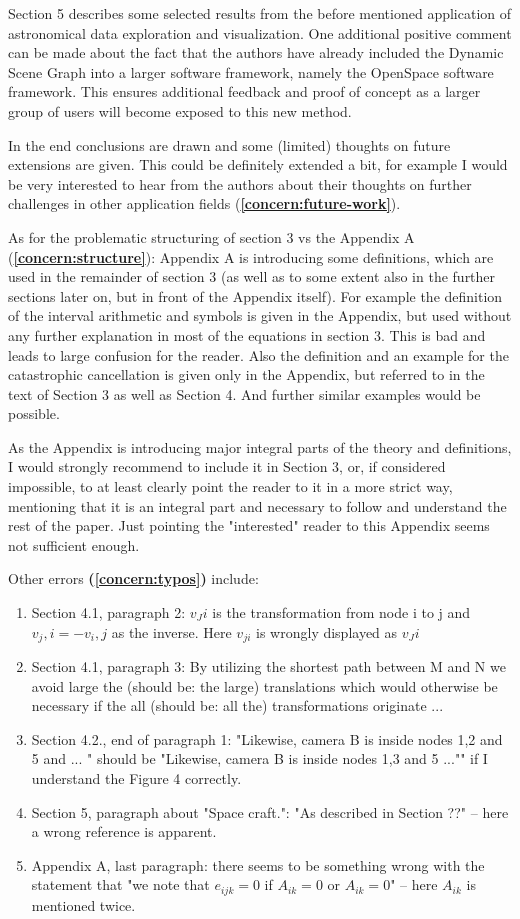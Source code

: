 \documentclass{article}
\let\oldref\ref
\renewcommand{\ref}[1]{(\textbf{\oldref{#1}})}
\begin{document}
Section 5 describes some selected results from the before mentioned application of astronomical data exploration and visualization.
One additional positive comment can be made about the fact that the authors
have already included the Dynamic Scene Graph into a larger software framework, namely the OpenSpace software framework.
This ensures additional feedback and proof of concept as a larger group of users will become exposed to this new method.

In the end conclusions are drawn and some (limited) thoughts on future extensions are given.
This could be definitely extended a bit, for example I would be very interested to hear from the authors about their thoughts on further challenges in other application fields \ref{concern:future-work}.

As for the problematic structuring of section 3 vs the Appendix A \ref{concern:structure}: 
Appendix A is introducing some definitions, which are used in the remainder of section 3 (as well as to some extent also in the further sections later on, but in front of the Appendix itself). 
For example the definition of the interval arithmetic and symbols is given in the Appendix, but used without any further explanation in most of the equations in section 3.
This is bad and leads to large confusion for the reader.
Also the definition and an example for the catastrophic cancellation is given only in the Appendix, but referred to in the text of Section 3 as well as Section 4.
And further similar examples would be possible.

As the Appendix is introducing major integral parts of the theory and definitions, I would strongly recommend to include it in Section 3, or, if considered impossible, to at least clearly point the reader to it in a more strict way, mentioning that it is an integral part and necessary to follow and understand the rest of the paper.
Just pointing the "interested" reader to this Appendix seems not sufficient enough.

Other errors \textbf{\ref{concern:typos}} include: 

\begin{enumerate}
\item Section 4.1, paragraph 2: $v_Ji$ is the transformation from node i to j and $v_j,i=-v_i,j$ as the inverse.
Here $v_{ji}$ is wrongly displayed as $v_Ji$
\item Section 4.1, paragraph 3: By utilizing the shortest path between M and N we avoid large the (should be: the large) translations which would otherwise be necessary if the all (should be: all the) transformations originate ...
\item Section 4.2., end of paragraph 1: "Likewise, camera B is inside nodes 1,2 and 5 and ...
" should be "Likewise, camera B is inside nodes 1,3 and 5 ..."" if I understand the Figure 4 correctly.
\item Section 5, paragraph about "Space craft.": "As described in Section ??" -- here a wrong reference is apparent.
\item Appendix A, last paragraph: there seems to be something wrong with the statement that "we note that $e_{ijk}=0$ if $A_{ik}=0$ or $A_{ik}=0$" -- here $A_{ik}$ is mentioned twice.
\end{enumerate}
\end{document}
